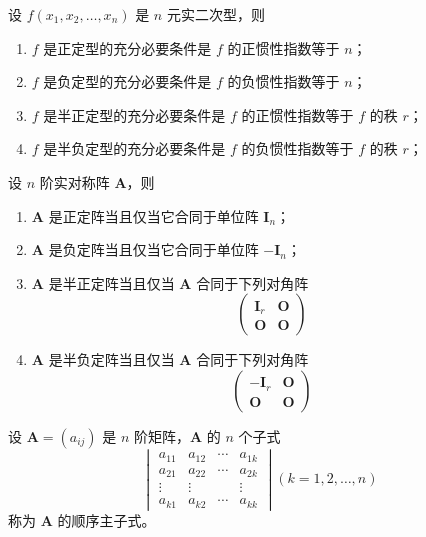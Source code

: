 \begin{theorem}
    设 $f(x_1, x_2, \ldots, x_n)$ 是 $n$ 元实二次型，则
    \begin{enumerate}
        \item $f$ 是正定型的充分必要条件是 $f$ 的正惯性指数等于 $n$；
        \item $f$ 是负定型的充分必要条件是 $f$ 的负惯性指数等于 $n$；
        \item $f$ 是半正定型的充分必要条件是 $f$ 的正惯性指数等于 $f$ 的秩 $r$；
        \item $f$ 是半负定型的充分必要条件是 $f$ 的负惯性指数等于 $f$ 的秩 $r$；
    \end{enumerate}
\end{theorem}

\begin{theorem}
    设 $n$ 阶实对称阵 $\bm{A}$，则
    \begin{enumerate}
        \item $\bm{A}$ 是正定阵当且仅当它合同于单位阵 $\bm{I}_n$；
        \item $\bm{A}$ 是负定阵当且仅当它合同于单位阵 $-\bm{I}_n$；
        \item $\bm{A}$ 是半正定阵当且仅当 $\bm{A}$ 合同于下列对角阵
              \[
                  \begin{pmatrix}
                      \bm{I}_{r} & \bm{O} \\
                      \bm{O}     & \bm{O}
                  \end{pmatrix}
              \]
        \item $\bm{A}$ 是半负定阵当且仅当 $\bm{A}$ 合同于下列对角阵
              \[
                  \begin{pmatrix}
                      -\bm{I}_{r} & \bm{O} \\
                      \bm{O}     & \bm{O}
                  \end{pmatrix}
              \]
    \end{enumerate}
\end{theorem}

\begin{definition}
  设 $\bm{A} = (a_{ij})$ 是 $n$ 阶矩阵，$\bm{A}$ 的 $n$ 个子式
  \[
      \begin{vmatrix} 
          a_{11}& a_{12}& \cdots & a_{1k}\\ 
          a_{21}& a_{22}& \cdots & a_{2k}\\ 
          \vdots& \vdots& \ & \vdots \\
          a_{k1}& a_{k2}& \cdots & a_{kk} 
      \end{vmatrix} 
      (k = 1, 2, \ldots, n)
  \]
  称为 $\bm{A}$ 的顺序主子式。
\end{definition}

